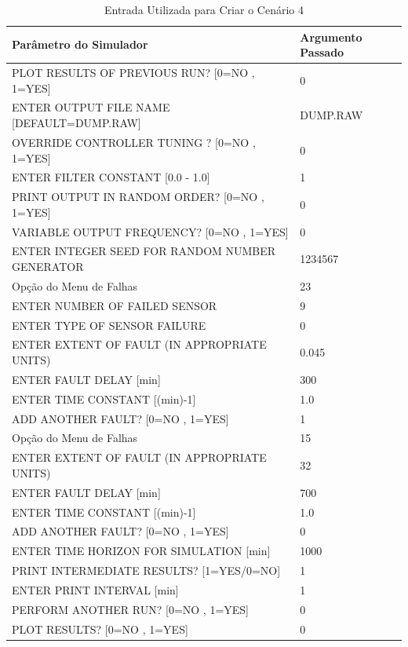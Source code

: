 \documentclass[journal]{IEEEtran}
\begin{document}
\begin{table}[H]
	\centering
	\normalsize
	\begin{tabular}{|l|l|}
		\hline
		Parâmetro do Simulador								& Argumento Passado \\
		\hline\hline
		PLOT RESULTS OF PREVIOUS RUN? [0=NO , 1=YES] 		& 0 				\\ \hline
		ENTER OUTPUT FILE NAME [DEFAULT=DUMP.RAW] 			& DUMP.RAW	\\ \hline
		OVERRIDE CONTROLLER TUNING ? [0=NO , 1=YES] 		& 0 				\\ \hline
		ENTER FILTER CONSTANT [0.0 - 1.0]					& 1 				\\ \hline
		PRINT OUTPUT IN RANDOM ORDER? [0=NO , 1=YES]		& 0 				\\ \hline
		VARIABLE OUTPUT FREQUENCY? [0=NO , 1=YES]			& 0 				\\ \hline
		ENTER INTEGER SEED FOR RANDOM NUMBER GENERATOR		& 1234567		\\ \hline
		Opção do Menu de Falhas		 						& 23 				\\ \hline
		ENTER NUMBER OF FAILED SENSOR		 				& 9 				\\ \hline
		ENTER TYPE OF SENSOR FAILURE		 				& 0 				\\ \hline
		ENTER EXTENT OF FAULT (IN APPROPRIATE UNITS) 		& 0.045				\\ \hline
		ENTER FAULT DELAY [min]								& 300				\\ \hline
		ENTER TIME CONSTANT [(min)-1]						& 1.0				\\ \hline
		ADD ANOTHER FAULT? [0=NO , 1=YES]					& 1 				\\ \hline
		Opção do Menu de Falhas		 						& 15 				\\ \hline
		ENTER EXTENT OF FAULT (IN APPROPRIATE UNITS) 		& 32				\\ \hline
		ENTER FAULT DELAY [min]								& 700				\\ \hline
		ENTER TIME CONSTANT [(min)-1]						& 1.0				\\ \hline
		ADD ANOTHER FAULT? [0=NO , 1=YES]					& 0 				\\ \hline
		ENTER TIME HORIZON FOR SIMULATION [min]  			& 1000			\\ \hline
		PRINT INTERMEDIATE RESULTS? [1=YES/0=NO] 			& 1 				\\ \hline
		ENTER PRINT INTERVAL [min]						  	& 1 				\\ \hline
		PERFORM ANOTHER RUN? [0=NO , 1=YES] 	  			& 0 				\\ \hline
		PLOT RESULTS? [0=NO , 1=YES] 					  	& 0 				\\ \hline
	\end{tabular}
	\caption{Entrada Utilizada para Criar o Cenário 4}
\end{table}
\end{document}
